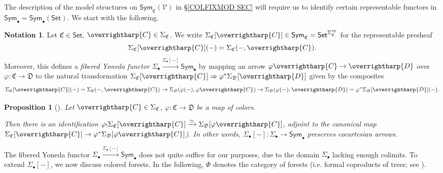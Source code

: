\documentclass[a4paper,10pt
 ,final
]{article}%
\numberwithin{equation}{section}
\numberwithin{figure}{section}
\newtheorem{proposition}[equation]{Proposition}%
\theoremstyle{definition} %
\newtheorem{notation}[equation]{Notation}%
\newcommand{\vect}[1]{\text{\overrightharp{\ensuremath{#1}}}}
\newcommand{\Sym}{\ensuremath{\mathsf{Sym}}}%
\newcommand{\V}{\ensuremath{\mathcal V}}
\newcommand{\1}{\ensuremath{\mathbbm 1}}%
\begin{document}
The description of the model structures 
on $\Sym_{\mathfrak C}(\V) $ in 
\S \ref{COLFIXMOD SEC}
will require us to identify certain
representable functors in 
$\mathsf{Sym}_{\bullet} = \mathsf{Sym}_{\bullet}(\mathsf{Set})$.
We start with the following.


\begin{notation}\label{FIBYON NOT}
Let $\mathfrak{C} \in \mathsf{Set}$, $\vect{C} \in \Sigma_{\mathfrak{C}}$.
We write
$\Sigma_{\mathfrak{C}}[\vect{C}] 
\in \mathsf{Sym}_{\mathfrak{C}} = \mathsf{Set}^{\Sigma_{\mathfrak{C}}^{op}}$ for the representable presheaf
\[\Sigma_{\mathfrak{C}}[\vect{C}](-)
= \Sigma_{\mathfrak{C}}(-,\vect{C}).\]
Moreover, this defines a 
\emph{fibered Yoneda functor}
$
\Sigma_{\bullet} \xrightarrow{\Sigma_{\bullet}[-]} \mathsf{Sym}_{\bullet}
$
by mapping an arrow
$\varphi \vect{C} \to \vect{D}$
over $\varphi \colon \mathfrak{C} \to \mathfrak{D}$
to the natural transformation 
$\Sigma_{\mathfrak{C}}[\vect{C}]
\Rightarrow
\varphi^{\**}
\Sigma_{\mathfrak{D}}[\vect{D}]
$ given by the composites
\[\Sigma_{\mathfrak{C}}[\vect{C}](-)
= \Sigma_{\mathfrak{C}}(-,\vect{C})
\to 
\Sigma_{\mathfrak{D}}(\varphi(-),\varphi\vect{C})
\to
\Sigma_{\mathfrak{D}}(\varphi(-),\vect{D})
=
\varphi^{\**} \Sigma_{\mathfrak{D}}[\vect{D}](-).
\]
\end{notation}



\begin{proposition}[{\cite[Prop. \ref{OC-FIBYONPUSH PROP}]{BP_FCOP}}]
        \label{FIBYONPUSH PROP}
        Let $\vect{C} \in \Sigma_{\mathfrak{C}}$,
        $\varphi \colon \mathfrak{C} \to \mathfrak{D}$
        be a map of colors.
        
        Then there is an identification
        $\varphi_{!} \Sigma_{\mathfrak{C}}[\vect{C}]
        \xrightarrow{\simeq}
        \Sigma_{\mathfrak{D}}[\varphi\vect{C}]$,
        adjoint to the canonical map
        $\Sigma_{\mathfrak{C}}[\vect{C}]
        \to
        \varphi^{\**}\Sigma_{\mathfrak{D}}[\varphi\vect{C}]$).
        In other words,
        $\Sigma_{\bullet}[-] \colon 
        \Sigma_{\bullet} \to \mathsf{Sym}_{\bullet}$
        preserves cocartesian arrows.
\end{proposition}


The fibered Yoneda functor
$
\Sigma_{\bullet} \xrightarrow{\Sigma_{\bullet}[-]} \mathsf{Sym}_{\bullet}
$
does not quite suffice for our purposes, 
due to the domain $\Sigma_{\bullet}$
lacking enough colimits.
To extend $\Sigma_{\bullet}[-]$,
we now discuss colored forests.
In the following, $\Phi$ denotes the category of forests
(i.e. formal coproducts of trees; see \cite[\S 5.1]{Per18}).
\end{document}
